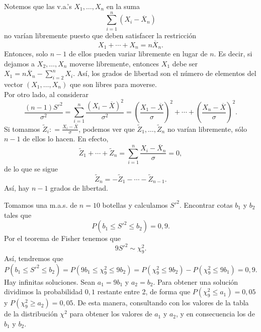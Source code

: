 \begin{observation}
Notemos que las v.a.'s $\displaystyle X_{1}, \ldots, X_{n} $ en la suma
\[\sum^{n}_{i = 1}\left(X_{i}-\overline{X}_{n}\right) \]
no varían libremente puesto que deben satisfacer la restricción
\[X_{1} + \cdots + X_{n}=n\overline{X}_{n} .\]
Entonces, solo $\displaystyle n-1 $ de ellos pueden variar libremente en lugar de $\displaystyle n $. Es decir, si dejamos a $\displaystyle X_{2}, \ldots, X_{n} $ moverse libremente, entonces $\displaystyle X_{1} $ debe ser $\displaystyle X_{1}=n\overline{X}_{n}-\sum^{n}_{i = 2}X_{i} $. Así, los grados de libertad son el número de elementos del vector $\displaystyle \left(X_{1}, \ldots, X_{n}\right) $ que son libres para moverse. \\

Por otro lado, al considerar
\[\frac{\left(n-1\right)S'^{2}}{\sigma^{2}}=\sum^{n}_{i = 1}\frac{\left(X_{i}-\overline{X}\right)^{2}}{\sigma^{2}}=\left(\frac{X_{1}-\overline{X}}{\sigma }\right)^{2} + \cdots + \left(\frac{X_{n}-\overline{X}}{\sigma }\right)^{2} .\]
Si tomamos $\displaystyle \tilde{Z}_{i} : = \frac{X_{i}-\overline{X}}{\sigma } $, podemos ver que $\displaystyle \tilde{Z}_{1}, \ldots, \tilde{Z}_{n} $ no varían libremente, sólo $\displaystyle n-1 $ de ellos lo hacen. En efecto,
\[\tilde{Z}_{1} + \cdots + \tilde{Z}_{n} = \sum^{n}_{i = 1}\frac{X_{i}-\overline{X}_{n}}{\sigma }=0 ,\]
de lo que se sigue
\[\tilde{Z}_{n}=-\tilde{Z}_{1}-\cdots -\tilde{Z}_{n-1} .\]
Así, hay $\displaystyle n-1 $ grados de libertad.
\end{observation}
\begin{eg}
Tomamos una m.a.s. de $\displaystyle n = 10 $ botellas y calculamos $\displaystyle S'^{2} $. Encontrar cotas $\displaystyle b_{1} $ y $\displaystyle b_{2} $ tales que 
\[P\left(b_{1}\leq S'^{2} \leq b_{2}\right)=0,9 .\]
Por el teorema de Fisher tenemos que 
\[9S'^{2}\sim \chi^{2}_{9} .\]
Así, tendremos que 
\[P\left(b_{1}\leq S'^{2}\leq b_{2}\right)=P\left(9b_{1} \leq \chi^{2}_{9}\leq 9b_{2}\right) = P\left(\chi^{2}_{9}\leq 9b_{2}\right)-P\left(\chi^{2}_{9}\leq 9b_{1}\right)=0,9 .\]
Hay infinitas soluciones. Sean $\displaystyle a_{1}= 9b_{1} $ y $\displaystyle a_{2}=b_{2} $. Para obtener una solución dividimos la probabilidad $\displaystyle 0,1 $ restante entre 2, de forma que $\displaystyle P\left(\chi_{9}^{2}\leq a_{1}\right)=0,05 $ y $\displaystyle P\left(\chi_{9}^{2}\geq a_{2}\right)=0,05 $. De esta manera, consultando con los valores de la tabla de la distribución $\displaystyle \chi^{2} $ para obtener los valores de $\displaystyle a_{1} $ y $\displaystyle a_{2} $, y en consecuencia los de $\displaystyle b_{1} $ y $\displaystyle b_{2} $. 
\end{eg}
